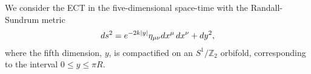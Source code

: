 \documentclass[twocolumn,showpacs,showkeys,prd,superscriptaddress]{revtex4-1}
\begin{document}
%



We consider the ECT in the five-dimensional space-time with the Randall-Sundrum metric~\cite{Randall:1999ee}
\begin{align}
  \label{RSmetric}
  ds^2 = e^{-2k\left|y\right|}\eta_{\mu\nu}dx^\mu\,dx^\nu + dy^2,
\end{align}
where the fifth dimension, $y$, is compactified on an  $S^1/\mathbb{Z}_2$ orbifold, corresponding to the interval \mbox{$0\leq y\leq \pi R$}. 

\end{document}
